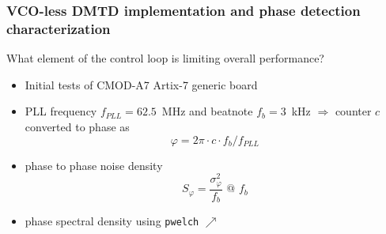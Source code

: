 \documentclass[compress,10pt,aspectratio=169]{beamer}
\begin{document}
\begin{frame}[fragile]\frametitle{VCO-less DMTD implementation and phase detection characterization}

What element of the control loop is limiting overall performance?

\vspace{0.3cm}
\begin{minipage}[t]{1.06\linewidth}
\begin{minipage}{.49\linewidth}


\begin{itemize}
\item Initial tests of CMOD-A7 Artix-7 generic board
\item PLL frequency $f_{PLL}=62.5$~MHz and beatnote $f_b=3$~kHz $\Rightarrow$ counter $c$ converted
to phase as $$\varphi=2\pi\cdot c\cdot f_b/f_{PLL}$$
\item phase to phase noise density $$S_\varphi=\frac{\sigma^2_\varphi}{f_b}\mbox{ @ }f_b$$
\item phase spectral density using {\tt pwelch} $\nearrow$
\end{itemize}
\end{minipage}
\begin{minipage}{.49\linewidth}
\vspace{0.0cm}


\end{minipage}
\end{minipage}
\end{frame}
\end{document}
